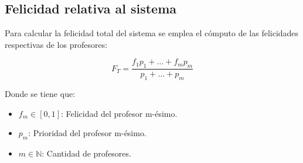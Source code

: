 \subsection{Felicidad relativa al sistema}
Para calcular la felicidad total del sistema se emplea el cómputo de las felicidades respectivas de los profesores:

\begin{equation}
	F_T = \frac{f_1p_1 + \dots + f_mp_m}{p_1 + \dots + p_m}
\end{equation}

\noindent Donde se tiene que:
\begin{itemize}
	\item $f_m \in [0, 1]$: Felicidad del profesor m-ésimo.
	\item $p_m$: Prioridad del profesor m-ésimo.
	\item $m \in \mathbb{N}$: Cantidad de profesores.
\end{itemize}





